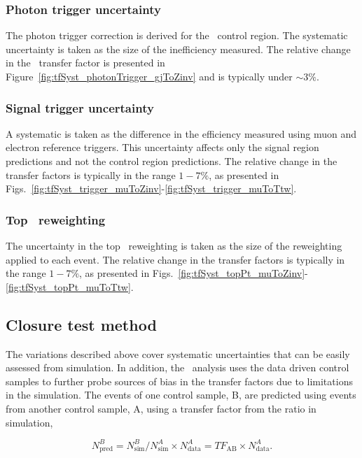 \subsubsection{Photon trigger uncertainty}
\label{sec:tfSyst_pho}
The photon trigger correction is derived for the \gj~control region. The systematic uncertainty is
taken as the size of the inefficiency measured. The relative change in the \gj~transfer factor 
is presented in Figure~\ref{fig:tfSyst_photonTrigger_gjToZinv} and is typically under $\sim3\%$.

\subsubsection{Signal trigger uncertainty}
\label{sec:tfSyst_trigger}

A systematic is taken as the difference in the efficiency measured using muon and 
electron reference triggers. This uncertainty affects only the signal region predictions
and not the control region predictions. The relative change in the transfer factors is typically in the range
$1-7\%$, as presented in Figs.~\ref{fig:tfSyst_trigger_muToZinv}-\ref{fig:tfSyst_trigger_muToTtw}.

\subsubsection{Top \pt~reweighting}
\label{sec:topSyst}
The uncertainty in the top \pt~reweighting is taken as the size of the reweighting
applied to each event. The relative change in the transfer factors is typically in the range
$1-7\%$, as presented in Figs.~\ref{fig:tfSyst_topPt_muToZinv}-\ref{fig:tfSyst_topPt_muToTtw}.  

\subsection{Closure test method}
\label{sec:closure-tests}
The variations described above cover systematic uncertainties that can be easily assessed 
from simulation. In addition, the \alphat~analysis uses the data driven control samples to
further probe sources of bias in the transfer factors due to limitations in the simulation.
The events of one control sample, B, are predicted using events from another control sample, A,
using a transfer factor from the ratio in simulation, 

\begin{equation}
\label{equ:abPred}
N^{B}_{\text{pred}} = N^{B}_{\text{sim}}/N^{A}_{\text{sim}} \times N^{A}_{\text{data}} = TF_{\text{AB}} \times N^{A}_{\text{data}}.
\end{equation}

